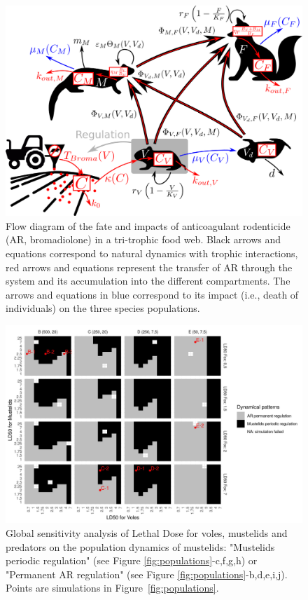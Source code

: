 \documentclass[11pt]{article}
\begin{document}
\begin{figure}
	\begin{center}
		\includegraphics[width=.8\linewidth]{img/system_scheme.png}
		\caption{Flow diagram of the fate and impacts of anticoagulant rodenticide (AR, bromadiolone) in a tri-trophic food web. Black arrows and equations correspond to natural dynamics with trophic interactions, red arrows and equations represent the transfer of AR through the system and its accumulation into the different compartments. The arrows and equations in blue correspond to its impact (i.e., death of individuals) on the three species populations.}
		\label{fig:scheme}
	\end{center}
\end{figure}



\begin{figure}
	\begin{center}
		\includegraphics[width=\linewidth]{img/plt_GSA.jpg}
		\caption{Global sensitivity analysis of Lethal Dose for voles, mustelids and predators on the population dynamics of mustelids: "Mustelids periodic regulation" (see Figure \ref{fig:populations}-c,f,g,h) or "Permanent AR regulation" (see Figure \ref{fig:populations}-b,d,e,i,j). Points are simulations in Figure~\ref{fig:populations}.}
		\label{fig:GSA}
	\end{center}
\end{figure}
\end{document}
